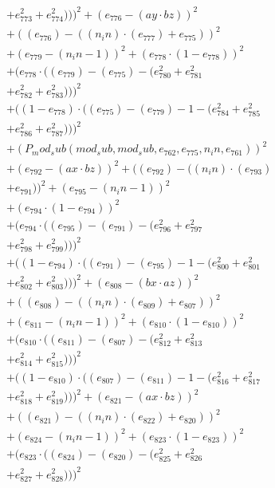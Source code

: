 \documentclass[10pt, a4paper]{article}
\begin{document}
\begin{small}
\begin{align*}
& + e_{773}^{2} + e_{774}^{2})))^{2} + (e_{776} - (ay  \cdot  bz))^{2} \\
& + ((e_{776}) - ((n_in)  \cdot  (e_{777}) + e_{775}))^{2} \\
& + (e_{779} - (n_in - 1))^{2} + (e_{778}  \cdot  (1 - e_{778}))^{2} \\
& + (e_{778}  \cdot  ((e_{779}) - (e_{775}) - (e_{780}^{2} + e_{781}^{2} \\
& + e_{782}^{2} + e_{783}^{2})))^{2} \\
& + ((1 - e_{778})  \cdot  ((e_{775}) - (e_{779}) - 1 - (e_{784}^{2} + e_{785}^{2} \\
& + e_{786}^{2} + e_{787}^{2})))^{2} \\
& + (P_mod_sub(mod_sub, mod_sub, e_{762}, e_{775}, n_in, e_{761}))^{2} \\
& + (e_{792} - (ax  \cdot  bz))^{2} + ((e_{792}) - ((n_in)  \cdot  (e_{793}) \\
& + e_{791}))^{2} + (e_{795} - (n_in - 1))^{2} \\
& + (e_{794}  \cdot  (1 - e_{794}))^{2} \\
& + (e_{794}  \cdot  ((e_{795}) - (e_{791}) - (e_{796}^{2} + e_{797}^{2} \\
& + e_{798}^{2} + e_{799}^{2})))^{2} \\
& + ((1 - e_{794})  \cdot  ((e_{791}) - (e_{795}) - 1 - (e_{800}^{2} + e_{801}^{2} \\
& + e_{802}^{2} + e_{803}^{2})))^{2} + (e_{808} - (bx  \cdot  az))^{2} \\
& + ((e_{808}) - ((n_in)  \cdot  (e_{809}) + e_{807}))^{2} \\
& + (e_{811} - (n_in - 1))^{2} + (e_{810}  \cdot  (1 - e_{810}))^{2} \\
& + (e_{810}  \cdot  ((e_{811}) - (e_{807}) - (e_{812}^{2} + e_{813}^{2} \\
& + e_{814}^{2} + e_{815}^{2})))^{2} \\
& + ((1 - e_{810})  \cdot  ((e_{807}) - (e_{811}) - 1 - (e_{816}^{2} + e_{817}^{2} \\
& + e_{818}^{2} + e_{819}^{2})))^{2} + (e_{821} - (ax  \cdot  bz))^{2} \\
& + ((e_{821}) - ((n_in)  \cdot  (e_{822}) + e_{820}))^{2} \\
& + (e_{824} - (n_in - 1))^{2} + (e_{823}  \cdot  (1 - e_{823}))^{2} \\
& + (e_{823}  \cdot  ((e_{824}) - (e_{820}) - (e_{825}^{2} + e_{826}^{2} \\
& + e_{827}^{2} + e_{828}^{2})))^{2} \\

\end{align*}
\end{small}
\end{document}

